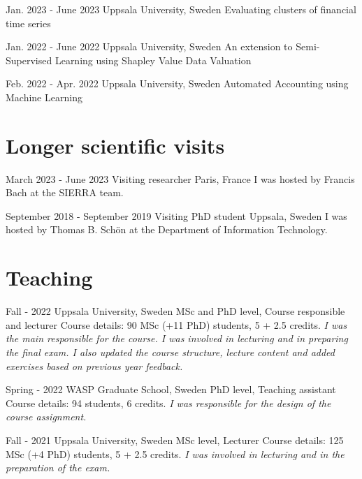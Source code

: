 \documentclass[10pt,letterpaper]{article} %
\begin{document}
        { Jan. 2023 - June 2023 }
        {  }
        { Uppsala University, Sweden }
        { { Evaluating clusters of financial time series } }
        
        { Jan. 2022 - June 2022 }
        {  }
        { Uppsala University, Sweden }
        { { An extension to Semi-Supervised Learning using Shapley Value Data Valuation } }
        
        { Feb. 2022 - Apr. 2022 }
        {  }
        { Uppsala University, Sweden }
        { { Automated Accounting using Machine Learning } }
        


\section*{Longer scientific visits}

    
        { March 2023 - June 2023 }
        { Visiting researcher }
        { Paris, France }
        { I was hosted by Francis Bach at the SIERRA team.}
    
        { September 2018 - September 2019 }
        { Visiting PhD student }
        { Uppsala, Sweden }
        { I was hosted by Thomas B. Schön at the Department of Information Technology.}
    

\section*{Teaching}


    {   Fall - 2022  }
    { Uppsala University, Sweden }
    { MSc and PhD level, Course responsible and lecturer }
    { Course details: 90 MSc (+11 PhD) students, 5 + 2.5 credits.  \emph{ I was the main responsible for the course. I was involved in lecturing and in preparing the final exam. I also updated the course structure, lecture content and added exercises based on previous year feedback. } }
    
    {   Spring - 2022  }
    { WASP Graduate School, Sweden }
    { PhD level, Teaching assistant }
    { Course details: 94 students, 6 credits.  \emph{ I was responsible for the design of the course assignment. } }
    
    {   Fall - 2021  }
    { Uppsala University, Sweden }
    { MSc level, Lecturer }
    { Course details: 125 MSc (+4 PhD) students, 5 + 2.5 credits.  \emph{ I was involved in lecturing and in the preparation of the exam. } }
    
\end{document}
